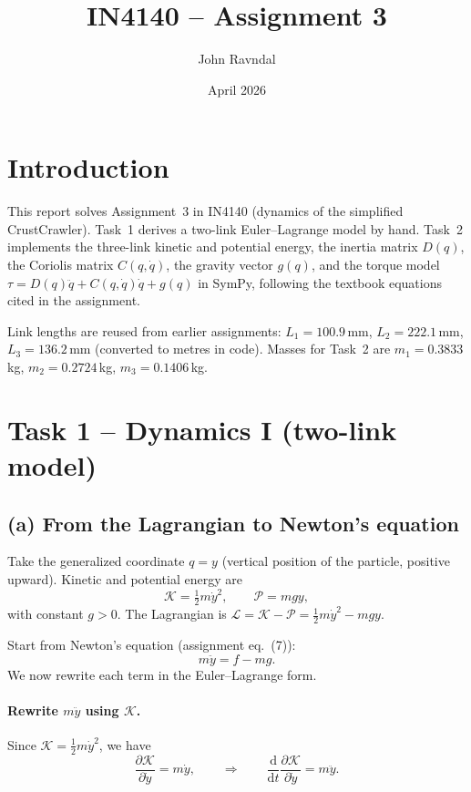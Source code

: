 \documentclass{article}
\title{IN4140 -- Assignment 3}
\author{John Ravndal}
\date{April 2026}
\begin{document}
\maketitle

\section{Introduction}

This report solves Assignment~3 in IN4140 (dynamics of the simplified CrustCrawler). Task~1 derives a two-link Euler--Lagrange model by hand. Task~2 implements the three-link kinetic and potential energy, the inertia matrix $D(q)$, the Coriolis matrix $C(q,\dot q)$, the gravity vector $g(q)$, and the torque model $\tau = D(q)\ddot q + C(q,\dot q)\dot q + g(q)$ in SymPy, following the textbook equations cited in the assignment.

Link lengths are reused from earlier assignments: $L_1 = 100.9$\,mm, $L_2 = 222.1$\,mm, $L_3 = 136.2$\,mm (converted to metres in code). Masses for Task~2 are $m_1 = 0.3833$\,kg, $m_2 = 0.2724$\,kg, $m_3 = 0.1406$\,kg.

\section{Task 1 -- Dynamics I (two-link model)}

\subsection*{(a) From the Lagrangian to Newton's equation}

Take the generalized coordinate $q = y$ (vertical position of the particle, positive upward). Kinetic and potential energy are
\begin{equation}
    \mathcal{K} = \tfrac{1}{2} m \dot y^2,
    \qquad
    \mathcal{P} = m g y,
\end{equation}
with constant $g>0$. The Lagrangian is $\mathcal{L} = \mathcal{K} - \mathcal{P} = \tfrac{1}{2} m \dot y^2 - m g y$.

Start from Newton's equation (assignment eq.~(7)):
\begin{equation}
    m \ddot y = f - m g.
\end{equation}
We now rewrite each term in the Euler--Lagrange form.

\paragraph{Rewrite $m\ddot y$ using $\mathcal{K}$.}
Since $\mathcal{K} = \tfrac{1}{2}m\dot y^2$, we have
\begin{equation}
    \frac{\partial \mathcal{K}}{\partial \dot y} = m \dot y,
    \qquad\Rightarrow\qquad
    \frac{\mathrm{d}}{\mathrm{d}t}\frac{\partial \mathcal{K}}{\partial \dot y} = m \ddot y.
\end{equation}
\end{document}
